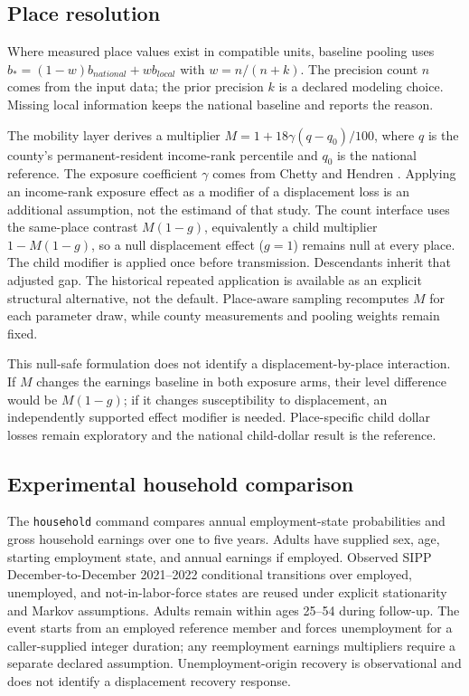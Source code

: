 \documentclass[10pt]{article}
\begin{document}
\subsection{Place resolution}
Where measured place values exist in compatible units, baseline pooling
uses $b_*=(1-w)b_{national}+wb_{local}$ with $w=n/(n+k)$. The precision
count $n$ comes from the input data; the prior precision $k$ is a declared
modeling choice. Missing local information keeps the national baseline
and reports the reason.

The mobility layer derives a multiplier
$M=1+18\gamma(q-q_0)/100$, where $q$ is the county's permanent-resident
income-rank percentile and $q_0$ is the national reference. The exposure
coefficient $\gamma$ comes from Chetty and Hendren
\cite{chettyhendren2018}. Applying an income-rank exposure effect as a
modifier of a displacement loss is an additional assumption, not the
estimand of that study. The count interface uses the same-place contrast
$M(1-g)$, equivalently a child multiplier $1-M(1-g)$, so a null displacement
effect ($g=1$) remains null at every place. The child modifier is applied
once before transmission. Descendants inherit that adjusted gap. The
historical repeated application is available as an explicit structural
alternative, not the default. Place-aware sampling recomputes $M$ for each parameter draw,
while county measurements and pooling weights remain fixed.

This null-safe formulation does not identify a displacement-by-place
interaction. If $M$ changes the earnings baseline in both exposure arms,
their level difference would be $M(1-g)$; if it changes susceptibility to
displacement, an independently supported effect modifier is needed.
Place-specific child dollar losses remain exploratory and the national
child-dollar result is the reference.

\subsection{Experimental household comparison}
The \texttt{household} command compares annual employment-state
probabilities and gross household earnings over one to five years.
Adults have supplied sex, age, starting employment state, and annual
earnings if employed. Observed SIPP December-to-December 2021--2022
conditional transitions over employed, unemployed, and not-in-labor-force
states are reused under explicit stationarity and Markov assumptions.
Adults remain within ages 25--54 during follow-up. The event starts from
an employed reference member and forces unemployment for a caller-supplied
integer duration; any reemployment earnings multipliers require a separate
declared assumption. Unemployment-origin recovery is observational and
does not identify a displacement recovery response.
\end{document}
